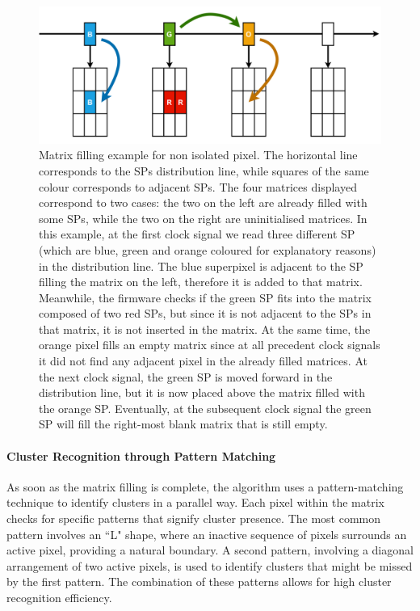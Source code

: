 \begin{figure}
    \centering
    \includegraphics[width=\textwidth]{figures/matrix_filling_clustering.png}
    \caption{Matrix filling example for non isolated pixel. The horizontal line corresponds to the SPs distribution line, while squares of the same colour corresponds to adjacent SPs. The four matrices displayed correspond to two cases: the two on the left are already filled with some SPs, while the two on the right are uninitialised matrices. In this example, at the first clock signal we read three different SP (which are blue, green and orange coloured for explanatory reasons) in the distribution line. The blue superpixel is adjacent to the SP filling the matrix on the left, therefore it is added to that matrix. Meanwhile, the firmware checks if the green SP fits into the matrix composed of two red SPs, but since it is not adjacent to the SPs in that matrix, it is not inserted in the matrix. At the same time, the orange pixel fills an empty matrix since at all precedent clock signals it did not find any adjacent pixel in the already filled matrices. At the next clock signal, the green SP is moved forward in the distribution line, but it is now placed above the matrix filled with the orange SP. Eventually, at the subsequent clock signal the green SP will fill the right-most blank matrix that is still empty.}
    \label{fig:matrix_filling_clustering}
\end{figure}

\paragraph{Cluster Recognition through Pattern Matching}
As soon as the matrix filling is complete, the algorithm uses a pattern-matching technique to identify clusters in a parallel way. Each pixel within the matrix checks for specific patterns that signify cluster presence. The most common pattern involves an ``L" shape, where an inactive sequence of pixels surrounds an active pixel, providing a natural boundary. A second pattern, involving a diagonal arrangement of two active pixels, is used to identify clusters that might be missed by the first pattern. The combination of these patterns allows for high cluster recognition efficiency.

